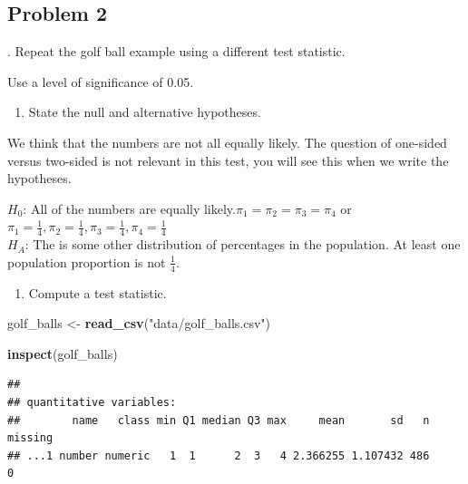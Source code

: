 \documentclass[
]{book}
\newenvironment{Shaded}{\begin{snugshade}}{\end{snugshade}}
\newcommand{\KeywordTok}[1]{\textcolor[rgb]{0.13,0.29,0.53}{\textbf{#1}}}
\newcommand{\NormalTok}[1]{#1}
\newcommand{\StringTok}[1]{\textcolor[rgb]{0.31,0.60,0.02}{#1}}
\providecommand{\tightlist}{%
  \setlength{\itemsep}{0pt}\setlength{\parskip}{0pt}}
\begin{document}
\hypertarget{problem-2-19}{%
\subsection{Problem 2}\label{problem-2-19}}

. Repeat the golf ball example using a different test statistic.

Use a level of significance of 0.05.

\begin{enumerate}
\def\labelenumi{\alph{enumi}.}
\tightlist
\item
  State the null and alternative hypotheses.
\end{enumerate}

We think that the numbers are not all equally likely. The question of one-sided versus two-sided is not relevant in this test, you will see this when we write the hypotheses.

\(H_0\): All of the numbers are equally likely.\(\pi_1 = \pi_2 = \pi_3 = \pi_4\) or \(\pi_1 = \frac{1}{4}, \pi_2 =\frac{1}{4}, \pi_3 =\frac{1}{4}, \pi_4 =\frac{1}{4}\)\\
\(H_A\): The is some other distribution of percentages in the population. At least one population proportion is not \(\frac{1}{4}\).

\begin{enumerate}
\def\labelenumi{\alph{enumi}.}
\setcounter{enumi}{1}
\tightlist
\item
  Compute a test statistic.
\end{enumerate}

\begin{Shaded}
\begin{Highlighting}[]
\NormalTok{golf_balls <-}\StringTok{ }\KeywordTok{read_csv}\NormalTok{(}\StringTok{"data/golf_balls.csv"}\NormalTok{)}
\end{Highlighting}
\end{Shaded}

\begin{Shaded}
\begin{Highlighting}[]
\KeywordTok{inspect}\NormalTok{(golf_balls)}
\end{Highlighting}
\end{Shaded}

\begin{verbatim}
## 
## quantitative variables:  
##        name   class min Q1 median Q3 max     mean       sd   n missing
## ...1 number numeric   1  1      2  3   4 2.366255 1.107432 486       0
\end{verbatim}
\end{document}
